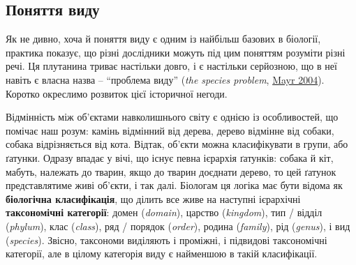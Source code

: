 \documentclass[
  11pt,
]{book}
\begin{document}
\subsection{Поняття виду}\label{ux43fux43eux43dux44fux442ux442ux44f-ux432ux438ux434ux443}

Як не дивно, хоча й поняття виду є одним із найбільш базових в біології, практика показує, що різні дослідники можуть під цим поняттям розуміти різні речі. Ця плутанина триває настільки довго, і є настільки серйозною, що в неї навіть є власна назва -- ``проблема виду'' (\emph{the species problem}, \href{https://doi.org/10.1017/CBO9780511617188}{Mayr 2004}). Коротко окреслимо розвиток цієї історичної негоди.

Відмінність між об'єктами навколишнього світу є однією із особливостей, що помічає наш розум: камінь відмінний від дерева, дерево відмінне від собаки, собака відрізняється від кота. Відтак, об'єкти можна класифікувати в групи, або ґатунки. Одразу впадає у вічі, що існує певна ієрархія ґатунків: собака й кіт, мабуть, належать до тварин, якщо до тварин доєднати дерево, то цей ґатунок представлятиме живі об'єкти, і так далі. Біологам ця логіка має бути відома як \textbf{біологічна класифікація}, що ділить все живе на наступні ієрархічні \textbf{таксономічні категорії}: домен (\emph{domain}), царство (\emph{kingdom}), тип / відділ (\emph{phylum}), клас (\emph{class}), ряд / порядок (\emph{order}), родина (\emph{family}), рід (\emph{genus}), і вид (\emph{species}). Звісно, таксономи виділяють і проміжні, і підвидові таксономічні категорії, але в цілому категорія виду є найменшою в такій класифікації.
\end{document}
